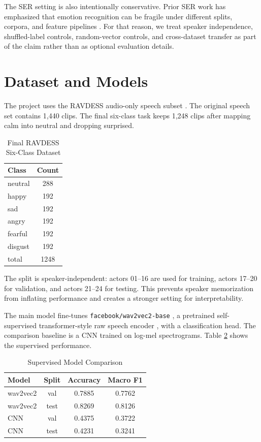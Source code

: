 \documentclass[conference]{IEEEtran}
\newcommand{\reporttablesize}{\footnotesize}
\begin{document}
The SER setting is also intentionally conservative. Prior SER work has emphasized that emotion recognition can be fragile under different splits, corpora, and feature pipelines \cite{schuller2009emotion,khalil2019serreview,lieskovska2021attentionreview}. For that reason, we treat speaker independence, shuffled-label controls, random-vector controls, and cross-dataset transfer as part of the claim rather than as optional evaluation details.

\section{Dataset and Models}

The project uses the RAVDESS audio-only speech subset \cite{livingstone2018ravdess}. The original speech set contains 1,440 clips. The final six-class task keeps 1,248 clips after mapping calm into neutral and dropping surprised.

\begin{table}[t]
\caption{Final RAVDESS Six-Class Dataset}
\label{tab:dataset}
\centering
\reporttablesize
\begin{tabular}{@{}lc@{}}
\toprule
\textbf{Class} & \textbf{Count} \\
\midrule
neutral & 288 \\
happy & 192 \\
sad & 192 \\
angry & 192 \\
fearful & 192 \\
disgust & 192 \\
\midrule
total & 1248 \\
\bottomrule
\end{tabular}
\end{table}

The split is speaker-independent: actors 01--16 are used for training, actors 17--20 for validation, and actors 21--24 for testing. This prevents speaker memorization from inflating performance and creates a stronger setting for interpretability.

The main model fine-tunes \texttt{facebook/wav2vec2-base} \cite{baevski2020wav2vec2}, a pretrained self-supervised transformer-style raw speech encoder \cite{vaswani2017attention}, with a classification head. The comparison baseline is a CNN trained on log-mel spectrograms. Table \ref{tab:model_comparison} shows the supervised performance.

\begin{table}[t]
\caption{Supervised Model Comparison}
\label{tab:model_comparison}
\centering
\reporttablesize
\begin{tabular}{@{}lccc@{}}
\toprule
\textbf{Model} & \textbf{Split} & \textbf{Accuracy} & \textbf{Macro F1} \\
\midrule
wav2vec2 & val & 0.7885 & 0.7762 \\
wav2vec2 & test & 0.8269 & 0.8126 \\
CNN & val & 0.4375 & 0.3722 \\
CNN & test & 0.4231 & 0.3241 \\
\bottomrule
\end{tabular}
\end{table}
\end{document}
